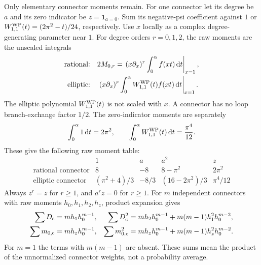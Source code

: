Only elementary connector moments remain. For one connector let its
degree be $a$ and its zero indicator be $z=\mathbf1_{a=0}$. Sum its
negative-psi coefficient against $1$ or
$W^{\rm WP}_{1,1}(t)=(2\pi^2-t)/24$, respectively. Use $x$ locally
as a complex degree-generating parameter near $1$. For degree orders
$r=0,1,2$, the raw moments are the unscaled integrals
\[
\begin{aligned}
 \text{rational:}\quad &2M_{0,r}
 =\left.(x\partial_x)^r\int_0^\alpha f(xt)\,\mathrm{d} t\right|_{x=1},\\
 \text{elliptic:}\quad &\left.(x\partial_x)^r
   \int_0^\alpha W^{\rm WP}_{1,1}(t)f(xt)\,\mathrm{d} t\right|_{x=1}.
\end{aligned}
\]
The elliptic polynomial $W^{\rm WP}_{1,1}(t)$ is not scaled with $x$. A connector
has no loop branch-exchange factor $1/2$. The zero-indicator moments
are separately
\[
 \int_0^\alpha 1\,\mathrm{d} t=2\pi^2,\qquad
 \int_0^\alpha W^{\rm WP}_{1,1}(t)\,\mathrm{d} t=\frac{\pi^4}{12}.
\]
These give the following raw moment table:
\begin{equation}\label{eq:a:connector-moments}
\begin{array}{c|rrrr}
 &1&a&a^2&z\\\hline
 \text{rational connector}&8&-8&8-\pi^2&2\pi^2\\
 \text{elliptic connector}&(\pi^2+4)/3&-8/3&(16-2\pi^2)/3&\pi^4/12
\end{array}
\end{equation}
Always $z^r=z$
for $r\geq1$, and $a^r z=0$ for $r\geq1$. For $m$ independent
connectors with raw moments $h_0,h_1,h_2,h_z$, product expansion gives
\begin{align*}
 \sum D_{\rm c}&=mh_1h_0^{m-1},&
 \sum D_{\rm c}^2&=mh_2h_0^{m-1}+m(m-1)h_1^2h_0^{m-2},\\
 \sum m_{0,\rm c}&=mh_zh_0^{m-1},&
 \sum m_{0,\rm c}^2&=mh_zh_0^{m-1}+m(m-1)h_z^2h_0^{m-2}.
\end{align*}
For $m=1$ the terms with $m(m-1)$ are absent. These sums mean the
product of the unnormalized connector weights, not a probability
average.

